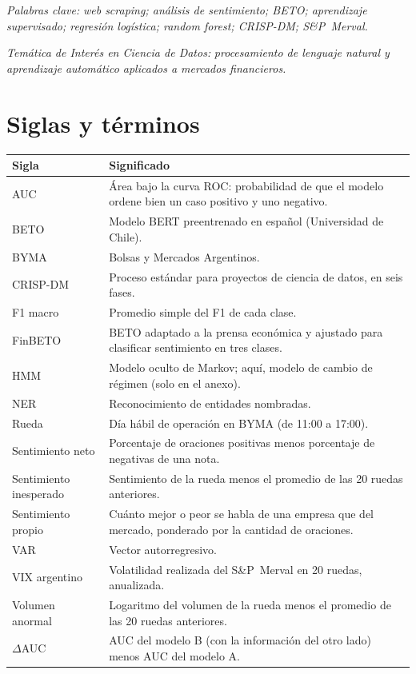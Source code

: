 \documentclass[11pt,a4paper,oneside]{report}
\begin{document}
\vspace{6pt}
\textit{Palabras clave:} \textit{web scraping; análisis de sentimiento; BETO; aprendizaje
supervisado; regresión logística; random forest; CRISP-DM; S\&P~Merval.}

\textit{Temática de Interés en Ciencia de Datos:} \textit{procesamiento de lenguaje natural
y aprendizaje automático aplicados a mercados financieros.}

\tableofcontents

\chapter*{Siglas y términos}
\begin{longtable}{@{}L{2.6cm}L{11.3cm}@{}}
\toprule
\textbf{Sigla} & \textbf{Significado} \\
\midrule
\endhead
AUC & Área bajo la curva ROC: probabilidad de que el modelo ordene bien un caso positivo y uno negativo. \\
BETO & Modelo BERT preentrenado en español (Universidad de Chile). \\
BYMA & Bolsas y Mercados Argentinos. \\
CRISP-DM & Proceso estándar para proyectos de ciencia de datos, en seis fases. \\
F1 macro & Promedio simple del F1 de cada clase. \\
FinBETO & BETO adaptado a la prensa económica y ajustado para clasificar sentimiento en tres clases. \\
HMM & Modelo oculto de Markov; aquí, modelo de cambio de régimen (solo en el anexo). \\
NER & Reconocimiento de entidades nombradas. \\
Rueda & Día hábil de operación en BYMA (de 11:00 a 17:00). \\
Sentimiento neto & Porcentaje de oraciones positivas menos porcentaje de negativas de una nota. \\
Sentimiento inesperado & Sentimiento de la rueda menos el promedio de las 20 ruedas anteriores. \\
Sentimiento propio & Cuánto mejor o peor se habla de una empresa que del mercado, ponderado por la cantidad de oraciones. \\
VAR & Vector autorregresivo. \\
VIX argentino & Volatilidad realizada del S\&P~Merval en 20 ruedas, anualizada. \\
Volumen anormal & Logaritmo del volumen de la rueda menos el promedio de las 20 ruedas anteriores. \\
$\Delta$AUC & AUC del modelo B (con la información del otro lado) menos AUC del modelo A. \\
\bottomrule
\end{longtable}
\end{document}
